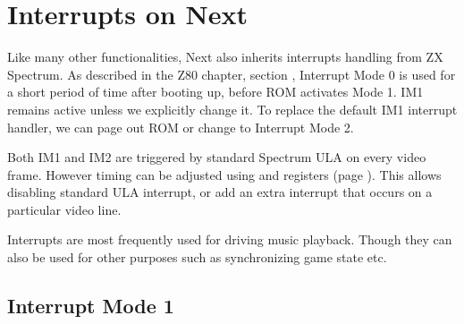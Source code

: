 \section{Interrupts on Next}
\label{zx_next_interrupts}


Like many other functionalities, Next also inherits interrupts handling from ZX Spectrum. As described in the Z80 chapter, section , Interrupt Mode 0 is used for a short period of time after booting up, before ROM activates Mode 1. IM1 remains active unless we explicitly change it. To replace the default IM1 interrupt handler, we can page out ROM or change to Interrupt Mode 2.

Both IM1 and IM2 are triggered by standard Spectrum ULA on every video frame. However timing can be adjusted using  and  registers (page ). This allows disabling standard ULA interrupt, or add an extra interrupt that occurs on a particular video line.

Interrupts are most frequently used for driving music playback. Though they can also be used for other purposes such as synchronizing game state etc.


\subsection{Interrupt Mode 1}

